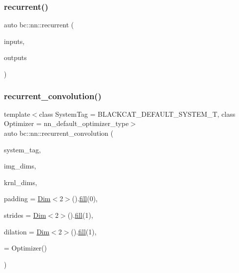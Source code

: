 \mbox{\label{namespacebc_1_1nn_ad12df9d8a92450f4ed84d3ccf0144ef9}} 
\subsubsection{\texorpdfstring{recurrent()}{recurrent()}\hspace{0.1cm}{\footnotesize\ttfamily [3/3]}}
{\footnotesize\ttfamily auto bc\+::nn\+::recurrent (\begin{DoxyParamCaption}\item[{int}]{inputs,  }\item[{int}]{outputs }\end{DoxyParamCaption})}

\mbox{\label{namespacebc_1_1nn_a64f5640dcd0235509fbbc88e49051d58}} 
\subsubsection{\texorpdfstring{recurrent\+\_\+convolution()}{recurrent\_convolution()}\hspace{0.1cm}{\footnotesize\ttfamily [1/2]}}
{\footnotesize\ttfamily template$<$class System\+Tag  = B\+L\+A\+C\+K\+C\+A\+T\+\_\+\+D\+E\+F\+A\+U\+L\+T\+\_\+\+S\+Y\+S\+T\+E\+M\+\_\+T, class Optimizer  = nn\+\_\+default\+\_\+optimizer\+\_\+type$>$ \\
auto bc\+::nn\+::recurrent\+\_\+convolution (\begin{DoxyParamCaption}\item[{System\+Tag}]{system\+\_\+tag,  }\item[{\hyperlink{structbc_1_1Dim}{Dim}$<$ 3 $>$}]{img\+\_\+dims,  }\item[{\hyperlink{structbc_1_1Dim}{Dim}$<$ 3 $>$}]{krnl\+\_\+dims,  }\item[{\hyperlink{structbc_1_1Dim}{Dim}$<$ 2 $>$}]{padding = {\ttfamily \hyperlink{structbc_1_1Dim}{Dim}$<$2$>$().\hyperlink{tensor__iteralgos_8h_afd10a40f252abd24d1faa2752becdd53}{fill}(0)},  }\item[{\hyperlink{structbc_1_1Dim}{Dim}$<$ 2 $>$}]{strides = {\ttfamily \hyperlink{structbc_1_1Dim}{Dim}$<$2$>$().\hyperlink{tensor__iteralgos_8h_afd10a40f252abd24d1faa2752becdd53}{fill}(1)},  }\item[{\hyperlink{structbc_1_1Dim}{Dim}$<$ 2 $>$}]{dilation = {\ttfamily \hyperlink{structbc_1_1Dim}{Dim}$<$2$>$().\hyperlink{tensor__iteralgos_8h_afd10a40f252abd24d1faa2752becdd53}{fill}(1)},  }\item[{Optimizer}]{ = {\ttfamily Optimizer()} }\end{DoxyParamCaption})}

